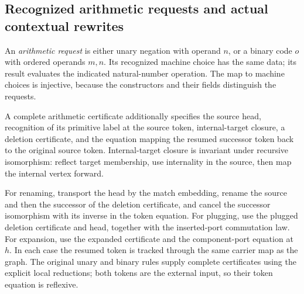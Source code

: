


\subsection{Recognized arithmetic requests and actual contextual rewrites}

An \emph{arithmetic request} is either unary negation with operand $n$, or a
binary code $o$ with ordered operands $m,n$. Its recognized machine choice has
the same data; its result evaluates the indicated natural-number operation.
The map to machine choices is injective, because the constructors and their
fields distinguish the requests.





A complete arithmetic certificate additionally specifies the source head,
recognition of its primitive label at the source token, internal-target closure,
a deletion certificate, and the equation mapping the resumed successor token
back to the original source token. Internal-target closure is invariant under
recursive isomorphism: reflect target membership, use internality in the source,
then map the internal vertex forward.



For renaming, transport the head by the match embedding, rename the source
and then the successor of the deletion certificate, and cancel the successor
isomorphism with its inverse in the token equation. For plugging, use the
plugged deletion certificate and head, together with the inserted-port
commutation law. For expansion, use the expanded certificate and the
component-port equation at $h$. In each case the resumed token is tracked through
the same carrier map as the graph. The original unary and binary rules supply
complete certificates using the explicit local reductions; both tokens are the
external input, so their token equation is reflexive.

